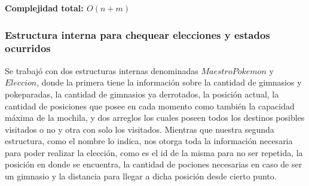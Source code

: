 \begin{algorithm}[H]
\textbf{\hfill Complejidad total: $O(n+m)$}\\ 
\end{algorithm}

\subsubsection{Estructura interna para chequear elecciones y estados ocurridos}

Se trabajó con dos estructuras internas denominadas $MaestroPokemon$ y $Eleccion$, donde la primera tiene la informaci\'on sobre la cantidad de gimnasios y pokeparadas, la cantidad de gimnasios ya derrotados, la posici\'on actual, la cantidad de posiciones que posee en cada momento como tambi\'en la capacidad m\'axima de la mochila, y dos arreglos los cuales poseen todos los destinos posibles visitados o no y otra con solo los visitados.
Mientras que nuestra segunda estructura, como el nombre lo indica, nos otorga toda la informaci\'on necesaria para poder realizar la elecci\'on, como es el id de la misma para no ser repetida, la posici\'on en donde se encuentra, la cantidad de pociones necesarias en caso de ser un gimnasio y la distancia para llegar a dicha posici\'on desde cierto punto.

